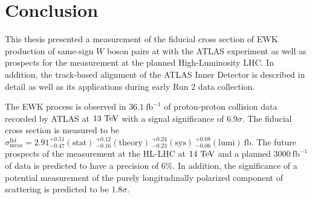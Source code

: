 \chapter[Conclusion][Conclusion]{Conclusion}

This thesis presented a measurement of the fiducial cross section of EWK production of same-sign $W$ boson pairs at  with the ATLAS experiment as well as prospects for the measurement at the planned High-Luminosity LHC.
In addition, the track-based alignment of the ATLAS Inner Detector is described in detail as well as its applications during early Run 2 data collection.

The \ssww EWK process is observed in $36.1~\textrm{fb}^{-1}$ of proton-proton collision data recorded by ATLAS at $13\tev$ with a signal significance of $6.9\sigma$.
The fiducial cross section is measured to be $\sigma_{\textrm{meas}}^{\textrm{fid}} = 2.91^{+0.51}_{-0.47}(\textrm{stat})~^{+0.12}_{-0.16}(\textrm{theory})~^{+0.24}_{-0.23}(\textrm{sys})~^{+0.08}_{-0.06}(\textrm{lumi})~\textrm{fb}$.
The future prospects of the measurement at the HL-LHC at $14\tev$ and a planned $3000~\textrm{fb}^{-1}$ of data is predicted to have a precision of $6\%$.
In addition, the significance of a potential measurement of the purely longitudinally polarized component of \sswwnojj scattering is predicted to be $1.8\sigma$.

%
